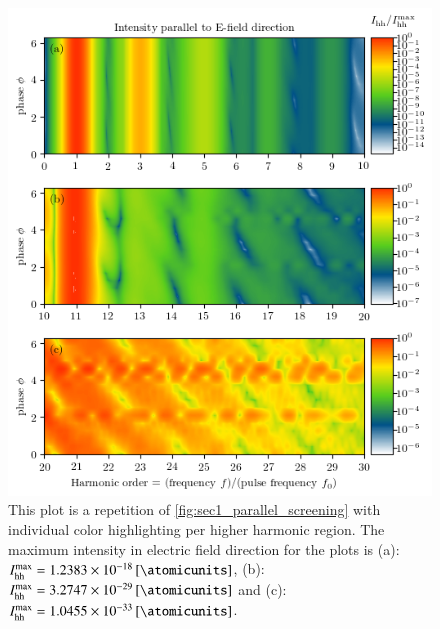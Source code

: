 \documentclass[11pt, a4paper]{scrartcl}
\begin{document}
\begin{figure}[H]
    \centering
    \includegraphics[width=\textwidth]{phase=variable_E_dir_split_plot.png}
    \caption{This plot is a repetition of \cref{fig:sec1_parallel_screening} with individual color
      highlighting per higher harmonic region. The maximum intensity in electric
      field direction for the plots is (a): $I_{\mathrm{hh}}^{\mathrm{max}} = \SI{1.2383e-18}{[\atomicunits]}$, 
      (b): $I_{\mathrm{hh}}^{\mathrm{max}} = \SI{3.2747e-29}{[\atomicunits]}$ and (c): 
      $I_{\mathrm{hh}}^{\mathrm{max}} = \SI{1.0455e-33}{[\atomicunits]}$.}
    \label{fig:sec1_parallel_screening_s}
\end{figure}
\end{document}
